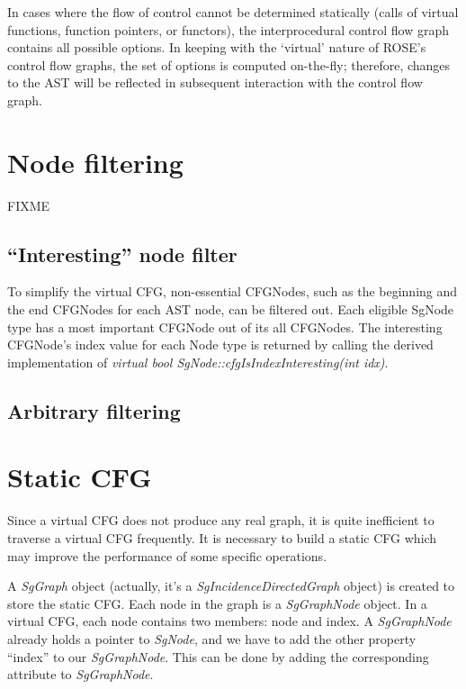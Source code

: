 In cases where the flow of control cannot be determined statically (calls of virtual
functions, function pointers, or functors), the interprocedural control flow
graph contains all possible options. In keeping with the `virtual' nature of
ROSE's control flow graphs, the set of options is computed on-the-fly;
therefore, changes to the AST will be reflected in subsequent interaction with
the control flow graph.  


\section{Node filtering}

FIXME

\subsection{``Interesting'' node filter}
\label{interesting_node_filter}
To simplify the virtual CFG, non-essential CFGNodes, such as the beginning
and the end CFGNodes for each AST node, can be filtered out. 
Each eligible SgNode type has a most important CFGNode out of its all
CFGNodes. The interesting CFGNode's index value for each Node type is returned by calling
the derived implementation of \textit {virtual bool SgNode::cfgIsIndexInteresting(int idx)}. 

\subsection{Arbitrary filtering}

\section{Static CFG}

Since a virtual CFG does not produce any real graph, it is quite inefficient to
traverse a virtual CFG frequently. It is necessary to build a static CFG which may
improve the performance of some specific operations. 

A \textit{SgGraph} object (actually, it's a \textit{SgIncidenceDirectedGraph} object) is created to 
store the static CFG. Each node in the graph is a \textit{SgGraphNode} object. In a virtual 
CFG, each node contains two members: node and index. A \textit{SgGraphNode} already holds a 
pointer to \textit{SgNode}, and we have to add the other property ``index'' to our \textit{SgGraphNode}.
This can be done by adding the corresponding attribute to \textit{SgGraphNode}.

